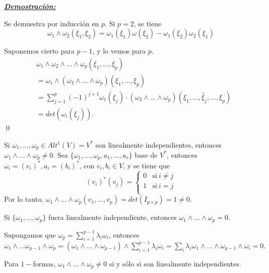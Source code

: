 \underline{\textbf{\textit{Demostración:}}}

Se demuestra por inducción en $p$. Si $p=2$, se tiene
$$\omega_1\wedge  \omega_2(\xi_1,\xi_2)=\omega_1(\xi_1)\omega(\xi_2)-\omega_1(\xi_2)\omega_2(\xi_1)$$

Suponemos cierto para $p-1$, y lo vemos para $p$.
\begin{equation}
\begin{split}
  &\omega_1\wedge \omega_2 \wedge \dots \wedge \omega_p (\xi_1,\dots,\xi_p)  \\
  &= \omega_1\wedge(\omega_2\wedge \dots \wedge \omega_p)(\xi_1,\dots,\xi_p) \\
  &= \sum_{j=1}^p (-1)^{j+1} \omega_1(\xi_j)\cdot(\omega_2\wedge \dots \wedge \omega_p)(\xi_1,\dots,\hat{\xi}_j,\dots,\xi_p) \\
  &= det(\omega_i(\xi_j)).
\end{split} 
\end{equation}
\qed

\begin{nota}
Si $\omega_1,\dots,\omega_p\in Alt^1(V)=V^*$ son linealmente independientes, entonces $\omega_1\wedge \dots \wedge \omega_p \neq 0.$ Sea $\{ \omega_1,\dots,\omega_p,a_1,\dots,a_r\}$ base de $V^*$, entonces $ \omega_i=(v_i)^*, a_i=(b_i)^* $, con $ v_i,b_i\in V $, y se tiene que  
\begin{equation}
(v_i)^*(v_j)= \left\{
  \begin{array}{ll}
    0      & \mathrm{si\ } i \neq j \\
    1 & \mathrm{si\ } i =j \\
  \end{array}
\right.
\end{equation}
Por lo tanto, $\omega_1\wedge \dots \wedge \omega_p(v_1,\dots,v_p)= det(I_{p\times p})=1 \neq 0.$

\end{nota}
\begin{nota}
Si $\{ \omega_1,\dots, \omega_p \}$ fuera linealmente independiente, entonces $\omega_1\wedge \dots \wedge \omega_p = 0.$

Supongamos que $\omega_p=\sum_{i=1}^{p-1}\lambda_i\omega_i$, entonces $\omega_1\wedge \dots \omega_{p-1}\wedge \omega_p= (\omega_1\wedge \dots \wedge \omega_{p-1})\wedge \sum_{i=1}^{p-1}\lambda_i\omega_i =\sum_i \lambda_i \omega_1 \wedge \dots \wedge \omega_{p-1}\wedge \omega_i =0. $
\end{nota}

\begin{Lem}
Para $1-$formas, $\omega_1\wedge \dots \wedge \omega_p\neq 0$ si y sólo si son linealmente independientes.
\end{Lem}

